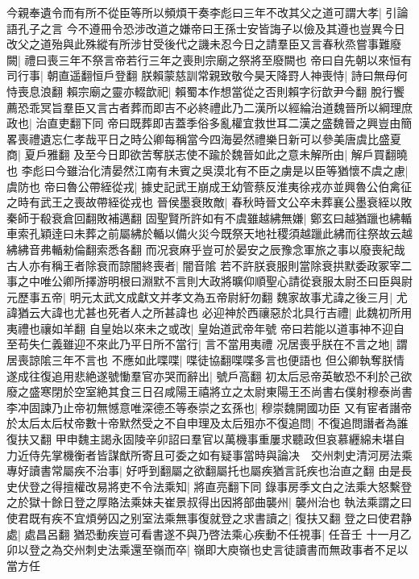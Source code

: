 今親奉遺令而有所不從臣等所以頻煩干奏李彪曰三年不改其父之道可謂大孝|{
	引論語孔子之言}
今不遵冊令恐涉改道之嫌帝曰王孫士安皆誨子以儉及其遵也豈異今日改父之道殆與此殊縱有所涉甘受後代之譏未忍今日之請羣臣又言春秋烝嘗事難廢闕|{
	禮曰喪三年不祭言帝若行三年之喪則宗廟之祭將至廢闕也}
帝曰自先朝以來恒有司行事|{
	朝直遥翻恒戶登翻}
朕賴蒙慈訓常親致敬今昊天降罸人神喪恃|{
	詩曰無母何恃喪息浪翻}
賴宗廟之靈亦輟歆祀|{
	賴蜀本作想當從之否則賴字衍歆尹今翻}
脫行饗薦恐乖冥旨羣臣又言古者葬而即吉不必終禮此乃二漢所以經綸治道魏晉所以綱理庶政也|{
	治直吏翻下同}
帝曰既葬即吉蓋季俗多亂權宜救世耳二漢之盛魏晉之興豈由簡畧喪禮遺忘仁孝哉平日之時公卿每稱當今四海晏然禮樂日新可以參美唐虞比盛夏商|{
	夏戶雅翻}
及至今日即欲苦奪朕志使不踰於魏晉如此之意未解所由|{
	解戶買翻曉也}
李彪曰今雖治化清晏然江南有未賓之吳漠北有不臣之虜是以臣等猶懷不虞之慮|{
	虞防也}
帝曰魯公帶絰從戎|{
	據史記武王崩成王幼管蔡反淮夷徐戎亦並興魯公伯禽征之時有武王之喪故帶絰從戎也}
晉侯墨衰敗敵|{
	春秋時晉文公卒未葬襄公墨衰絰以敗秦師于殽衰倉回翻敗補邁翻}
固聖賢所許如有不虞雖越紼無嫌|{
	鄭玄曰越猶躐也紼輴車索孔穎逹曰未葬之前屬紼於輴以備火災今既祭天地社稷須越躐此紼而往祭故云越紼紼音弗輴勑倫翻索悉各翻}
而况衰麻乎豈可於晏安之辰豫念軍旅之事以廢喪紀哉古人亦有稱王者除衰而諒闇終喪者|{
	闇音隂}
若不許朕衰服則當除衰拱默委政冢宰二事之中唯公卿所擇游明根曰淵默不言則大政將曠仰順聖心請從衰服太尉丕曰臣與尉元歷事五帝|{
	明元太武文成獻文并孝文為五帝尉紆勿翻}
魏家故事尤諱之後三月|{
	尤諱猶云大諱也尤甚也死者人之所甚諱也}
必迎神於西禳惡於北具行吉禮|{
	此魏初所用夷禮也禳如羊翻}
自皇始以來未之或改|{
	皇始道武帝年號}
帝曰若能以道事神不迎自至苟失仁義雖迎不來此乃平日所不當行|{
	言不當用夷禮}
况居喪乎朕在不言之地|{
	謂居喪諒隂三年不言也}
不應如此喋喋|{
	喋徒協翻喋喋多言也便語也}
但公卿執奪朕情遂成往復追用悲絶遂號慟羣官亦哭而辭出|{
	號戶高翻}
初太后忌帝英敏恐不利於己欲廢之盛寒閉於空室絶其食三日召咸陽王禧將立之太尉東陽王丕尚書右僕射穆泰尚書李冲固諫乃止帝初無憾意唯深德丕等泰崇之玄孫也|{
	穆崇魏開國功臣}
又有宦者譖帝於太后太后杖帝數十帝默然受之不自申理及太后殂亦不復追問|{
	不復追問譖者為誰復扶又翻}
甲申魏主謁永固陵辛卯詔曰羣官以萬機事重屢求聽政但哀慕纒綿未堪自力近侍先掌機衡者皆謀猷所寄且可委之如有疑事當時與論决　交州刺史清河房法乘專好讀書常屬疾不治事|{
	好呼到翻屬之欲翻屬托也屬疾猶言託疾也治直之翻}
由是長史伏登之得擅權改易將吏不令法乘知|{
	將直亮翻下同}
錄事房季文白之法乘大怒繫登之於獄十餘日登之厚賂法乘妹夫崔景叔得出因將部曲襲州|{
	襲州治也}
執法乘謂之曰使君既有疾不宜煩勞囚之别室法乘無事復就登之求書讀之|{
	復扶又翻}
登之曰使君静處|{
	處昌呂翻}
猶恐動疾豈可看書遂不與乃啓法乘心疾動不任視事|{
	任音壬}
十一月乙卯以登之為交州刺史法乘還至嶺而卒|{
	嶺即大庾嶺也史言徒讀書而無政事者不足以當方任}
